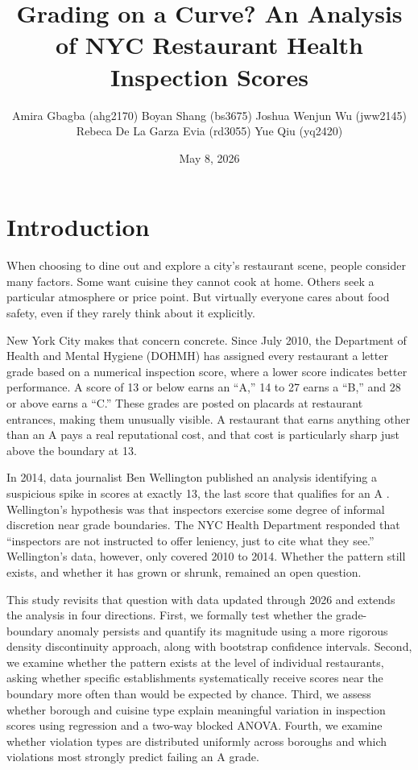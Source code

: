\documentclass[11pt, twocolumn]{article}
\title{\textbf{Grading on a Curve? An Analysis of NYC Restaurant Health Inspection Scores}}
\author{
  Amira Gbagba (ahg2170) \quad Boyan Shang (bs3675) \quad Joshua Wenjun Wu (jww2145) \\
  Rebeca De La Garza Evia (rd3055) \quad Yue Qiu (yq2420)
}
\date{May 8, 2026}
\begin{document}
\maketitle

\section{Introduction}

When choosing to dine out and explore a city's restaurant scene, people
consider many factors. Some want cuisine they cannot cook at home. Others
seek a particular atmosphere or price point. But virtually everyone cares
about food safety, even if they rarely think about it explicitly.

New York City makes that concern concrete. Since July 2010, the
Department of Health and Mental Hygiene (DOHMH) has assigned every
restaurant a letter grade based on a numerical inspection score, where a
lower score indicates better performance. A score of 13 or below earns an
``A,'' 14 to 27 earns a ``B,'' and 28 or above earns a ``C.'' These
grades are posted on placards at restaurant entrances, making them
unusually visible. A restaurant that earns anything other than an A pays a
real reputational cost, and that cost is particularly sharp just above
the boundary at 13.

In 2014, data journalist Ben Wellington published an analysis identifying
a suspicious spike in scores at exactly 13, the last score that qualifies
for an A \cite{wellington2014}. Wellington's hypothesis was that inspectors
exercise some degree of informal discretion near grade boundaries.
The NYC Health Department responded that ``inspectors are not instructed
to offer leniency, just to cite what they see.'' Wellington's data,
however, only covered 2010 to 2014. Whether the pattern still exists, and
whether it has grown or shrunk, remained an open question.

This study revisits that question with data updated through 2026 and
extends the analysis in four directions. First, we formally test whether
the grade-boundary anomaly persists and quantify its magnitude using a
more rigorous density discontinuity approach, along with bootstrap
confidence intervals. Second, we examine whether the pattern exists at the
level of individual restaurants, asking whether specific establishments
systematically receive scores near the boundary more often than would be
expected by chance. Third, we assess whether borough and cuisine type
explain meaningful variation in inspection scores using regression and
a two-way blocked ANOVA. Fourth, we examine whether violation types are
distributed uniformly across boroughs and which violations most strongly
predict failing an A grade.
\end{document}

